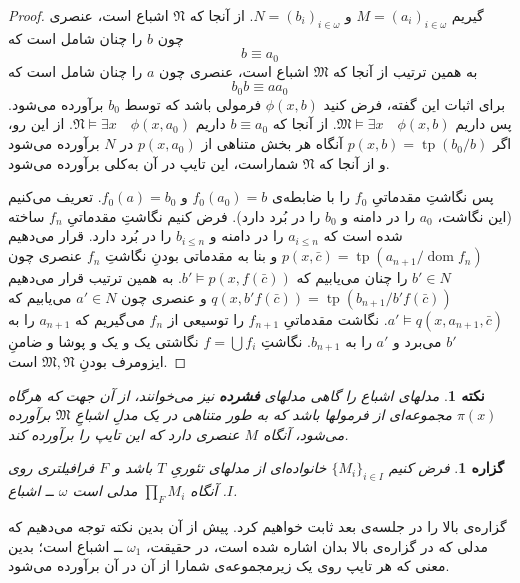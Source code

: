 \documentclass[12pt,a4paper]{report}
\theoremstyle{colorhead}
\newtheorem{prop}[thm]{گزاره}
\newtheorem{nokte}[thm]{نکته}
\DeclareMathOperator{\dom}{dom}
\DeclareMathOperator{\tp}{tp}
\begin{document}
\begin{proof}
گیریم
$M=(a_i)_{i\in \omega}$
و
$N=(b_i)_{i\in \omega}$.
از آنجا که
$\mathfrak{N}$
اشباع است، عنصری چون
$b$
را  چنان شامل است که
\[
b\equiv a_0
\]
به همین ترتیب از آنجا که
$\mathfrak{M}$
اشباع است، عنصری چون
$a$
را چنان شامل است که
\[
b_0b\equiv aa_0
\]
برای اثبات این گفته، فرض کنید
$\phi(x,b)$
فرمولی باشد که توسط
$b_0$
برآورده می‌شود. پس داریم
$\mathfrak{M}\models \exists x\quad \phi(x,b)$.
از آنجا که
$b\equiv a_0$
داریم
$\mathfrak{N}\models \exists x\quad \phi(x,a_0)$.
از این رو، اگر 
$p(x,b)=\tp(b_0/b)$
آنگاه هر بخش متناهی از 
$p(x,a_0)$
در
$N$
برآورده می‌شود و از آنجا که
$\mathfrak{N}$
شماراست، این تایپ در آن به‌کلی برآورده می‌شود. 
\par 
پس نگاشتِ
مقدماتیِ
$f_0$
را با ضابطه‌ی
$f_0(a_0)=b$
و
$f_0(a)=b_0$.
تعریف می‌کنیم (این نگاشت،
$a_0$
را در دامنه و 
$b_0$
را در بُرد دارد). فرض کنیم نگاشتِ مقدماتیِ
$f_n$
ساخته شده است که 
$a_{i\leq n}$
را در دامنه و
$b_{i\leq n}$
را در بُرد دارد. 
قرار می‌دهیم
$p(x,\bar{c})=\tp(a_{n+1}/\dom f_n)$
و بنا به مقدماتی بودنِ
نگاشتِ
$f_n$
عنصری چون
$b'\in N$
را
چنان می‌یابیم که
$b'\models p(x,f(\bar{c}))$.
به همین ترتیب 
قرار می‌دهیم
$q(x,b'f(\bar{c}))=\tp(b_{n+1}/b'f(\bar{c}))$
 و 
عنصری چون
$a'\in N$
می‌یابیم که
$a'\models q(x,a_{n+1},\bar{c})$.
نگاشت مقدماتیِ
$f_{n+1}$
را توسیعی از
$f_n$
می‌گیریم که
$a_{n+1}$
را به
$b'$
می‌برد و 
$a'$
را
به
$b_{n+1}$.
نگاشتِ
$f=\bigcup f_i$
نگاشتی یک و یک و پوشا و ضامنِ
ایزومرف بودنِ
$\mathfrak{M},\mathfrak{N}$
است. 
\end{proof}
\begin{nokte}
مدلهای اشباع را گاهی مدلهای
\textbf{ فشرده }
 نیز می‌خوانند، از آن جهت که هرگاه
$\pi(x)$
مجموعه‌ای از فرمولها باشد که به طور متناهی در یک مدلِ اشباعِ
$\mathfrak{M}$
برآورده می‌شود، آنگاه $M$
عنصری دارد که این تایپ را برآورده کند. 
\end{nokte}
\begin{prop}
فرض کنیم 
$\{M_i\}_{i\in I}$
خانواده‌ای از مدلهای تئوریِ
$T$
باشد و 
$F$
فرافیلتری روی
$I$.
آنگاه
$\prod_{F}M_i$
مدلی است
$\omega$
ــ‌
 اشباع. 
\end{prop}
گزاره‌ی بالا را در جلسه‌ی بعد ثابت خواهیم کرد. پیش از آن بدین نکته توجه می‌دهیم که مدلی که در گزاره‌ی بالا بدان اشاره شده است، در حقیقت،
$\omega_1$
ــ 
اشباع است؛ بدین معنی که هر تایپ روی یک زیرمجموعه‌ی شمارا  از آن در آن برآورده می‌شود.
\pagebreak
\end{document}
